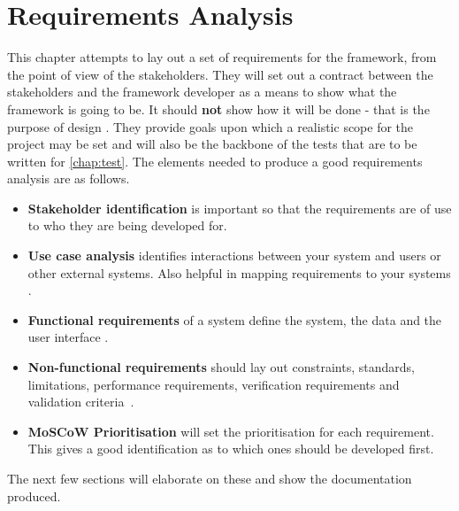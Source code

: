 \documentclass[11pt,oneside]{report}
\begin{document}
				
	\chapter{Requirements Analysis}\label{chap:req}
	This chapter attempts to lay out a set of requirements for the framework, from the point of view of the stakeholders.
	They will set out a contract between the stakeholders and the framework developer as a means to show what the framework is going to be. It should \textbf{not} show how it will be done - that is the purpose of design \cite{book:dawson}.
	They provide goals upon which a realistic scope for the project may be set and will also be the backbone of the tests that are to be written for \autoref{chap:test}.
	The elements needed to produce a good requirements analysis are as follows.
	\begin{itemize}
		\item \textbf{Stakeholder identification} is important so that the requirements are of use to who they are being developed for.
		\item \textbf{Use case analysis} identifies interactions between your system and users or other external systems. Also helpful in mapping requirements to your systems \cite{book:uml}.
		\item \textbf{Functional requirements} of a system define the system, the data and the user interface \cite{book:dawson}.
		\item \textbf{Non-functional requirements} should lay out constraints, standards, limitations, performance requirements, verification requirements and validation criteria~\cite{book:dawson}.
		\item \textbf{MoSCoW Prioritisation} will set the prioritisation for each requirement. This gives a good identification as to which ones should be developed first.
	\end{itemize}
	The next few sections will elaborate on these and show the documentation produced. 
		
\end{document}
